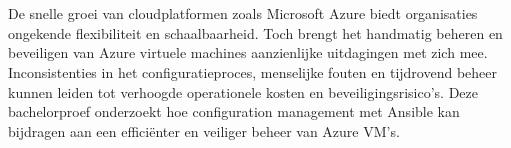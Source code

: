 
%
%
%
%
%

%



\chapter*{}

De snelle groei van cloudplatformen zoals Microsoft Azure biedt organisaties ongekende flexibiliteit en schaalbaarheid.
Toch brengt het handmatig beheren en beveiligen van Azure virtuele machines aanzienlijke uitdagingen met zich mee.
Inconsistenties in het configuratieproces, menselijke fouten en tijdrovend beheer kunnen leiden tot verhoogde operationele kosten en beveiligingsrisico's.
Deze bachelorproef onderzoekt hoe configuration management met Ansible kan bijdragen aan een efficiënter en veiliger beheer van Azure VM's.

